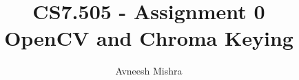 

\title{CS7.505 - Assignment 0 \\
    \Large OpenCV and Chroma Keying}

\author{Avneesh Mishra}


    \maketitle
    \tableofcontents
    \pagebreak
    
    \pagebreak
    

